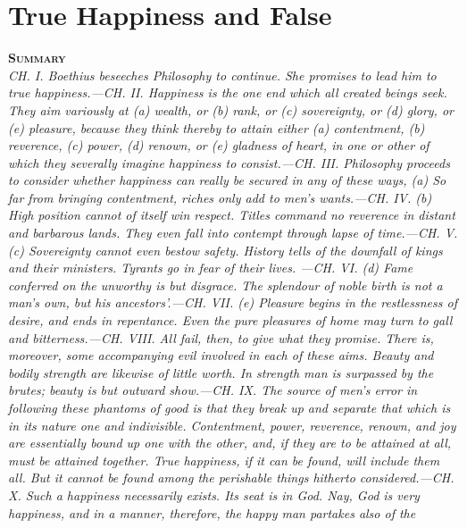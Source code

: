 \documentclass[11pt]{book}
\newenvironment{abstract}%
  {\noindent \textbf{\scshape Summary} \\ \rightskip1in\itshape\small}%
  {\bigskip}
\begin{document}
\chapter{True Happiness and False}

\begin{abstract}
     CH. I. Boethius beseeches Philosophy to continue. She promises to
     lead him to true happiness.---CH. II. Happiness is the one end which
     all created beings seek. They aim variously at (\emph{a}) wealth, or
     (\emph{b}) rank, or (\emph{c}) sovereignty, or (\emph{d}) glory, or (\emph{e})
     pleasure, because they think thereby to attain either (\emph{a})
     contentment, (\emph{b}) reverence, (\emph{c}) power, (\emph{d}) renown, or (\emph{e})
     gladness of heart, in one or other of which they severally imagine
     happiness to consist.---CH. III. Philosophy proceeds to consider
     whether happiness can really be secured in any of these ways, (\emph{a})
     So far from bringing contentment, riches only add to men's
     wants.---CH. IV. (\emph{b}) High position cannot of itself win respect.
     Titles command no reverence in distant and barbarous lands. They
     even fall into contempt through lapse of time.---CH. V. (\emph{c})
     Sovereignty cannot even bestow safety. History tells of the
     downfall of kings and their ministers. Tyrants go in fear of their
     lives. ---CH. VI. (\emph{d}) Fame conferred on the unworthy is but
     disgrace. The splendour of noble birth is not a man's own, but his
     ancestors'.---CH. VII. (\emph{e}) Pleasure begins in the restlessness of
     desire, and ends in repentance. Even the pure pleasures of home may
     turn to gall and bitterness.---CH. VIII. All fail, then, to give
     what they promise. There is, moreover, some accompanying evil
     involved in each of these aims. Beauty and bodily strength are
     likewise of little worth. In strength man is surpassed by the
     brutes; beauty is but outward show.---CH. IX. The source of men's
     error in following these phantoms of good is that \emph{they break up and separate that which is in its nature one and indivisible}.
     Contentment, power, reverence, renown, and joy are essentially
     bound up one with the other, and, if they are to be attained at
     all, must be attained \emph{together}. True happiness, if it can be
     found, will include them all. But it cannot be found among the
     perishable things hitherto considered.---CH. X. Such a happiness
     necessarily exists. Its seat is in God. Nay, God is very happiness,
     and in a manner, therefore, the happy man partakes also of the

\end{abstract}
\end{document}
